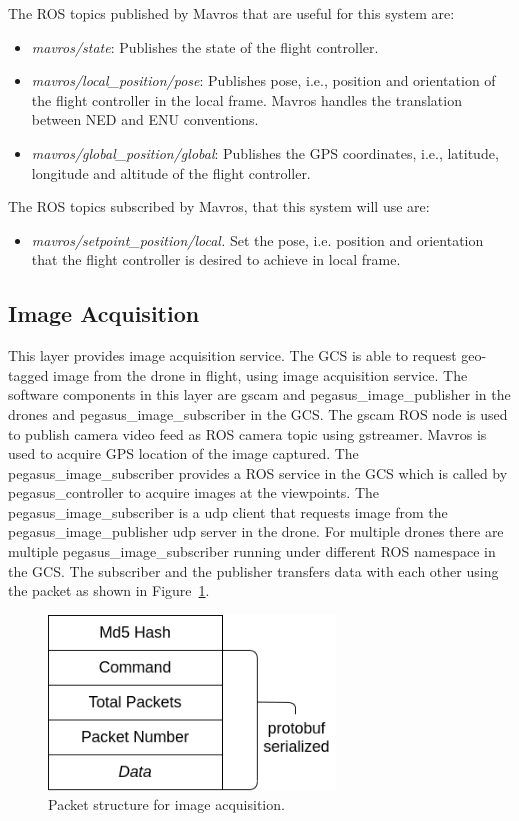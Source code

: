 The ROS topics published by Mavros that are useful for this system are:
\begin{itemize}
	\item \textit{mavros/state}: Publishes the state of the flight controller.
	\item \textit{mavros/local\_position/pose}: Publishes pose, i.e., position and orientation of the flight controller in the local frame. Mavros handles the translation between NED and ENU conventions.
	\item \textit{mavros/global\_position/global}: Publishes the GPS coordinates, i.e., latitude, longitude and altitude of the flight controller.
\end{itemize}

The ROS topics subscribed by Mavros, that this system will use are:
\begin{itemize}
	\item \textit{mavros/setpoint\_position/local.} Set the pose, i.e. position and orientation that the flight controller is desired to achieve in local frame.
\end{itemize}


\subsection{Image Acquisition}

This layer provides image acquisition service. The GCS is able to request geo-tagged image from the drone in flight, using image acquisition service. The software components in this layer are gscam and pegasus\_image\_publisher in the drones and pegasus\_image\_subscriber in the GCS. The gscam ROS node is used to publish camera video feed as ROS camera topic using gstreamer. Mavros is used to acquire GPS location of the image captured. The pegasus\_image\_subscriber provides a ROS service in the GCS which is called by pegasus\_controller to acquire images at the viewpoints. The pegasus\_image\_subscriber is a udp client that requests image from the pegasus\_image\_publisher udp server in the drone. For multiple drones there are multiple pegasus\_image\_subscriber running under different ROS namespace in the GCS. The subscriber and the publisher transfers data with each other using the packet as shown in Figure~\ref{fig:image-packet}.

\begin{figure}
	\centering
	\caption[Packet structure for image acquisition.]{\small Packet structure for image acquisition.} 
	\label{fig:image-packet}
	\includegraphics[width=3in]{figures/methodology/methodology-Image-packet}
\end{figure}

